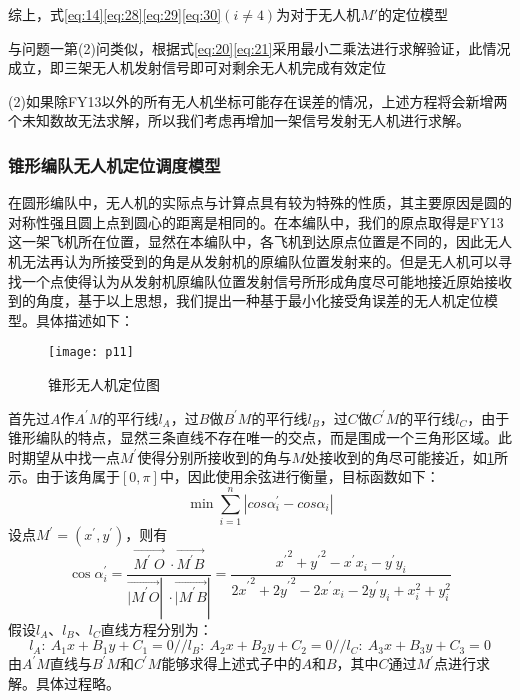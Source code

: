 \documentclass{cumcmthesis}
\begin{document}
综上，式\cref{eq:14}\cref{eq:28}\cref{eq:29}\cref{eq:30}$(i \ne 4)$为对于无人机$M'$的定位模型

与问题一第(2)问类似，根据式\cref{eq:20}\cref{eq:21}采用最小二乘法进行求解验证，此情况成立，即三架无人机发射信号即可对剩余无人机完成有效定位

(2)如果除FY13以外的所有无人机坐标可能存在误差的情况，上述方程将会新增两个未知数故无法求解，所以我们考虑再增加一架信号发射无人机进行求解。



\subsubsection{锥形编队无人机定位调度模型}
在圆形编队中，无人机的实际点与计算点具有较为特殊的性质，其主要原因是圆的对称性强且圆上点到圆心的距离是相同的。在本编队中，我们的原点取得是FY13这一架飞机所在位置，显然在本编队中，各飞机到达原点位置是不同的，因此无人机无法再认为所接受到的角是从发射机的原编队位置发射来的。但是无人机可以寻找一个点使得认为从发射机原编队位置发射信号所形成角度尽可能地接近原始接收到的角度，基于以上思想，我们提出一种基于最小化接受角误差的无人机定位模型。具体描述如下：
\begin{figure}[H]
	\centering
	\texttt{[image: p11]}
	\caption{锥形无人机定位图}
	\label{fig:p11}
\end{figure}
首先过$A$作$A^\prime M$的平行线$l_A$，过$B$做$B^\prime M$的平行线$l_B$，过$C$做$C^\prime M$的平行线$l_C$，由于锥形编队的特点，显然三条直线不存在唯一的交点，而是围成一个三角形区域。此时期望从中找一点$M^\prime$使得分别所接收到的角与$M$处接收到的角尽可能接近，如\cref{fig:p11}所示。由于该角属于$[0,\pi]$中，因此使用余弦进行衡量，目标函数如下：
\begin{equation}
		\min \sum_{i=1}^{n}{|cos\alpha_i^\prime-cos\alpha_i|}
	\label{eq:31}
\end{equation}
设点$M^\prime=(x^\prime,y^\prime)$，则有
\begin{equation}
	\cos \alpha_i^\prime=\frac{\vec{M^\prime\ O}\ \cdot\vec{M^\prime B}}{\vec{{|M}^\prime O}|\ \cdot\vec{{|M}^\prime B}|}=\frac{{x^\prime}^2+{y^\prime}^2-x^\prime x_i-y^\prime y_i}{{{2x}^\prime}^2+{{2y}^\prime}^2-{2x}^\prime x_i-{2y}^\prime y_i+x_i^2+y_i^2}
	\label{eq:32}
\end{equation}
假设$l_A$、$l_B$、$l_C$直线方程分别为：
\begin{equation}
	l_A:\ A_1x+B_1y+C_1=0 //
	l_B:\ A_2x+B_2y+C_2=0//
	l_C:\ A_3x+B_3y+C_3=0
	\label{eq:33}
\end{equation}
由$A^\prime M$直线与$B^\prime M$和$C^\prime M$能够求得上述式子中的$A$和$B$，其中$C$通过$M^\prime$点进行求解。具体过程略。
\end{document}
